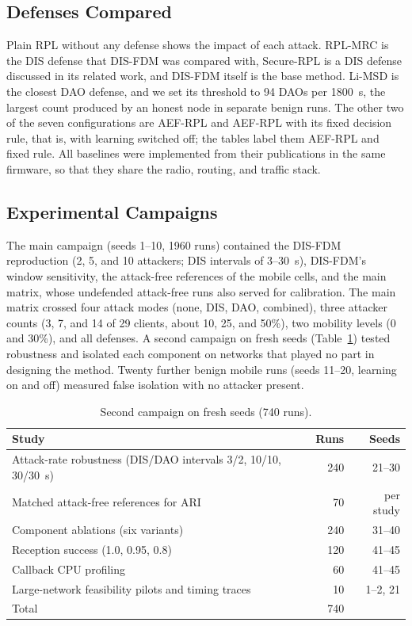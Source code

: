 \subsection{Defenses Compared}
Plain RPL without any defense shows the impact of each attack. RPL-MRC \cite{medjek2021} is the DIS defense that DIS-FDM was compared with, Secure-RPL \cite{vermaranga2020} is a DIS defense discussed in its related work, and DIS-FDM \cite{prajisha2025} itself is the base method. Li-MSD \cite{limsd2024} is the closest DAO defense, and we set its threshold to 94 DAOs per 1800~s, the largest count produced by an honest node in separate benign runs. The other two of the seven configurations are AEF-RPL and AEF-RPL with its fixed decision rule, that is, with learning switched off; the tables label them AEF-RPL and fixed rule. All baselines were implemented from their publications in the same firmware, so that they share the radio, routing, and traffic stack.

\subsection{Experimental Campaigns}
The main campaign (seeds 1--10, 1960 runs) contained the DIS-FDM reproduction (2, 5, and 10 attackers; DIS intervals of 3--30~s), DIS-FDM's window sensitivity, the attack-free references of the mobile cells, and the main matrix, whose undefended attack-free runs also served for calibration. The main matrix crossed four attack modes (none, DIS, DAO, combined), three attacker counts (3, 7, and 14 of 29 clients, about 10, 25, and 50\%), two mobility levels (0 and 30\%), and all defenses. A second campaign on fresh seeds (Table~\ref{tab:campaigns}) tested robustness and isolated each component on networks that played no part in designing the method. Twenty further benign mobile runs (seeds 11--20, learning on and off) measured false isolation with no attacker present.

\begin{table}[t]
\caption{Second campaign on fresh seeds (740 runs).}\label{tab:campaigns}
\centering\footnotesize
\begin{tabularx}{\columnwidth}{@{}Xrr@{}}\toprule
Study & Runs & Seeds \\\midrule
Attack-rate robustness (DIS/DAO intervals 3/2, 10/10, 30/30~s) & 240 & 21--30\\
Matched attack-free references for ARI & 70 & per study\\
Component ablations (six variants) & 240 & 31--40\\
Reception success (1.0, 0.95, 0.8) & 120 & 41--45\\
Callback CPU profiling & 60 & 41--45\\
Large-network feasibility pilots and timing traces & 10 & 1--2, 21\\\midrule
Total & 740 & \\\bottomrule
\end{tabularx}
\end{table}

